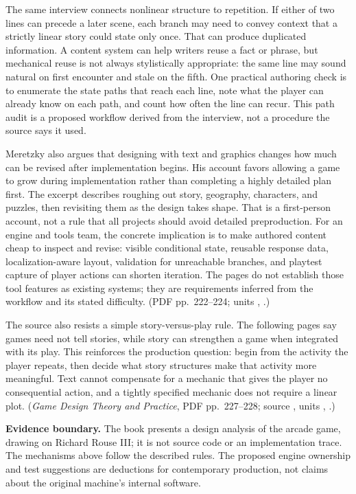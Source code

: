 The same interview connects nonlinear structure to repetition. If either of two lines can precede a later scene, each branch may need to convey context that a strictly linear story could state only once. That can produce duplicated information. A content system can help writers reuse a fact or phrase, but mechanical reuse is not always stylistically appropriate: the same line may sound natural on first encounter and stale on the fifth. One practical authoring check is to enumerate the state paths that reach each line, note what the player can already know on each path, and count how often the line can recur. This path audit is a proposed workflow derived from the interview, not a procedure the source says it used.

Meretzky also argues that designing with text and graphics changes how much can be revised after implementation begins. His account favors allowing a game to grow during implementation rather than completing a highly detailed plan first. The excerpt describes roughing out story, geography, characters, and puzzles, then revisiting them as the design takes shape. That is a first-person account, not a rule that all projects should avoid detailed preproduction. For an engine and tools team, the concrete implication is to make authored content cheap to inspect and revise: visible conditional state, reusable response data, localization-aware layout, validation for unreachable branches, and playtest capture of player actions can shorten iteration. The pages do not establish those tool features as existing systems; they are requirements inferred from the workflow and its stated difficulty. (PDF pp.~222--224; units , .)

The source also resists a simple story-versus-play rule. The following pages say games need not tell stories, while story can strengthen a game when integrated with its play. This reinforces the production question: begin from the activity the player repeats, then decide what story structures make that activity more meaningful. Text cannot compensate for a mechanic that gives the player no consequential action, and a tightly specified mechanic does not require a linear plot. (\emph{Game Design Theory and Practice}, PDF pp.~227--228; source , units , .)

\textbf{Evidence boundary.} The book presents a design analysis of the arcade game, drawing on Richard Rouse III; it is not source code or an implementation trace. The mechanisms above follow the described rules. The proposed engine ownership and test suggestions are deductions for contemporary production, not claims about the original machine's internal software.

